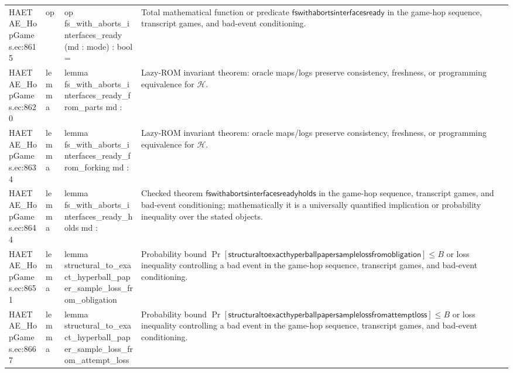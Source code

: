 \documentclass[10pt]{article}
\begin{document}
\begin{longtable}{L{0.11\textwidth}L{0.055\textwidth}L{0.385\textwidth}L{0.41\textwidth}}
HAETAE\_\allowbreak{}HopGames.\allowbreak{}ec:\allowbreak{}8615 & op & {\ttfamily\scriptsize op fs\_\allowbreak{}with\_\allowbreak{}aborts\_\allowbreak{}interfaces\_\allowbreak{}ready (md : mode) : bool =} & Total mathematical function or predicate $\mathsf{fswithabortsinterfacesready}$ in the game-hop sequence, transcript games, and bad-event conditioning. \\
HAETAE\_\allowbreak{}HopGames.\allowbreak{}ec:\allowbreak{}8620 & lemma & {\ttfamily\scriptsize lemma fs\_\allowbreak{}with\_\allowbreak{}aborts\_\allowbreak{}interfaces\_\allowbreak{}ready\_\allowbreak{}from\_\allowbreak{}parts md :} & Lazy-ROM invariant theorem: oracle maps/logs preserve consistency, freshness, or programming equivalence for $\mathcal H$. \\
HAETAE\_\allowbreak{}HopGames.\allowbreak{}ec:\allowbreak{}8634 & lemma & {\ttfamily\scriptsize lemma fs\_\allowbreak{}with\_\allowbreak{}aborts\_\allowbreak{}interfaces\_\allowbreak{}ready\_\allowbreak{}from\_\allowbreak{}forking md :} & Lazy-ROM invariant theorem: oracle maps/logs preserve consistency, freshness, or programming equivalence for $\mathcal H$. \\
HAETAE\_\allowbreak{}HopGames.\allowbreak{}ec:\allowbreak{}8644 & lemma & {\ttfamily\scriptsize lemma fs\_\allowbreak{}with\_\allowbreak{}aborts\_\allowbreak{}interfaces\_\allowbreak{}ready\_\allowbreak{}holds md :} & Checked theorem $\mathsf{fswithabortsinterfacesreadyholds}$ in the game-hop sequence, transcript games, and bad-event conditioning; mathematically it is a universally quantified implication or probability inequality over the stated objects. \\
HAETAE\_\allowbreak{}HopGames.\allowbreak{}ec:\allowbreak{}8651 & lemma & {\ttfamily\scriptsize lemma structural\_\allowbreak{}to\_\allowbreak{}exact\_\allowbreak{}hyperball\_\allowbreak{}paper\_\allowbreak{}sample\_\allowbreak{}loss\_\allowbreak{}from\_\allowbreak{}obligation} & Probability bound $\Pr[\mathsf{structuraltoexacthyperballpapersamplelossfromobligation}]\le B$ or loss inequality controlling a bad event in the game-hop sequence, transcript games, and bad-event conditioning. \\
HAETAE\_\allowbreak{}HopGames.\allowbreak{}ec:\allowbreak{}8667 & lemma & {\ttfamily\scriptsize lemma structural\_\allowbreak{}to\_\allowbreak{}exact\_\allowbreak{}hyperball\_\allowbreak{}paper\_\allowbreak{}sample\_\allowbreak{}loss\_\allowbreak{}from\_\allowbreak{}attempt\_\allowbreak{}loss} & Probability bound $\Pr[\mathsf{structuraltoexacthyperballpapersamplelossfromattemptloss}]\le B$ or loss inequality controlling a bad event in the game-hop sequence, transcript games, and bad-event conditioning. \\

\end{longtable}
\end{document}
